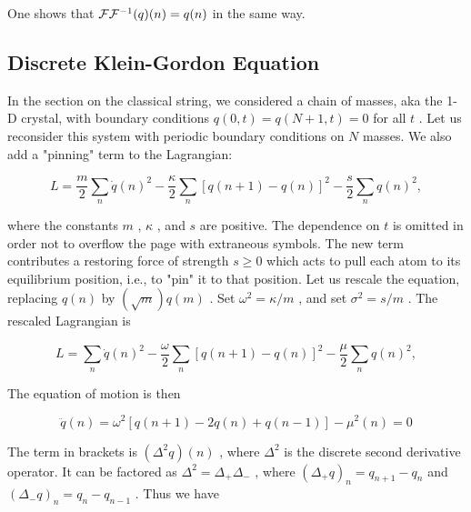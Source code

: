 One  shows  that   $\mathcal{F}\mathcal{F}^{-1}(q)(n) = q(n)$  in  the  same  way.



 \subsection{Discrete  Klein-Gordon  Equation}

In  the  section  on  the  classical  string,  we  considered
 a  chain  of  masses,  aka  the  1-D  crystal,  with  boundary  conditions   $q(0,t) = q(N+1,t) = 0$  for  all   $t$ .   Let  us  reconsider  this  system  with  periodic
 boundary  conditions  on   $N$  masses.   We  also  add  a  "pinning"  term  to  the  Lagrangian:



\begin{equation}
\label{crystallagrangian}
L = \frac{m}{2} \sum_n \dot q(n)^2 
- \frac{\kappa}{2}\sum_n [q(n+1) - q(n)]^2
- \frac{s}{2}\sum_n q(n)^2,
\end{equation}


where  the  constants   $m$ ,   $\kappa$ ,  and   $s$  are  positive.
 The  dependence  on   $t$  is  omitted  in  order  not  to  overflow  the  page  with  extraneous  symbols.
 The  new  term  contributes  a  restoring  force  of  strength   $s \ge 0$  which  acts  to  pull  each  atom  to  its  equilibrium  position,  i.e.,  to  "pin"  it  to  that  position.   Let  us  rescale  the  equation,  replacing   $q(n)$  by   $(\sqrt m)q(m)$ .   Set   $\omega^2 = \kappa/m$ ,  and  set   $\sigma^2 = s/m$ .   The  rescaled  Lagrangian  is



\begin{equation}
\label{crystallagrangian2}
L = \sum_n \dot q(n)^2 
- \frac{\omega}{2}\sum_n [q(n+1) - q(n)]^2
- \frac{\mu}{2}\sum_n q(n)^2,
\end{equation}


The  equation  of  motion  is  then



\begin{equation}
\label{discrete-wave-equation}
\ddot q(n) = \omega^2[q(n+1) - 2q(n) + q(n-1)] - \mu^2(n) = 0
\end{equation}


The  term  in  brackets  is   $(\Delta^2 q)(n)$ ,  where   $\Delta^2$  is  the  discrete  second  derivative  operator.   It  can  be  factored  as   $\Delta^2 = \Delta_+\Delta_-$ ,  where   $(\Delta_+q)_n = q_{n+1} - q_n$  and 
  $(\Delta_-q)_n = q_{n} - q_{n-1}$ .   Thus  we  have



